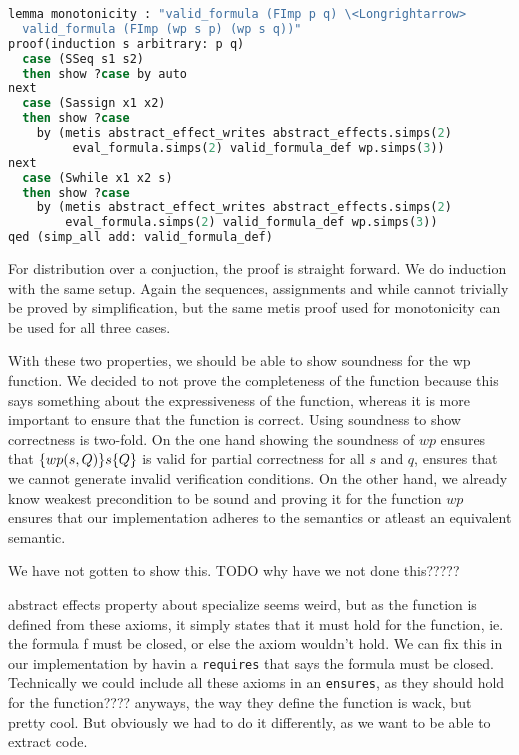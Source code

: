 \begin{lstlisting}[caption={Proof of monotonicity in Isabelle},label={lst:isamono},language=sml]
lemma monotonicity : "valid_formula (FImp p q) \<Longrightarrow>
  valid_formula (FImp (wp s p) (wp s q))"
proof(induction s arbitrary: p q)
  case (SSeq s1 s2)
  then show ?case by auto
next
  case (Sassign x1 x2)
  then show ?case
    by (metis abstract_effect_writes abstract_effects.simps(2)
         eval_formula.simps(2) valid_formula_def wp.simps(3))
next
  case (Swhile x1 x2 s)
  then show ?case
    by (metis abstract_effect_writes abstract_effects.simps(2)
        eval_formula.simps(2) valid_formula_def wp.simps(3))
qed (simp_all add: valid_formula_def)
\end{lstlisting}

For distribution over a conjuction, the proof is straight forward.
We do induction with the same setup.
Again the sequences, assignments and while cannot trivially be proved by simplification,
but the same metis proof used for monotonicity can be used for all three cases.

With these two properties, we should be able to show soundness for the wp function.
We decided to not prove the completeness of the function because this says something about the expressiveness of the function, whereas it is more important to ensure that
the function is correct.
Using soundness to show correctness is two-fold.
On the one hand showing the soundness of $wp$ ensures that $\{wp(s,Q)\}s\{Q\}$ is valid for partial correctness for all $s$ and $q$, ensures that we cannot generate invalid verification conditions.
On the other hand, we already know weakest precondition to be sound and proving it for the function $wp$ ensures that our implementation adheres to the semantics or atleast an equivalent semantic.

We have not gotten to show this.
TODO why have we not done this?????


abstract effects property about specialize seems weird, but as the function is defined
from these axioms, it simply states that it must hold for the function, ie. the formula f
must be closed, or else the axiom wouldn't hold.
We can fix this in our implementation by havin a \texttt{requires} that says the formula
must be closed.
Technically we could include all these axioms in an \texttt{ensures}, as they should hold
for the function???? anyways, the way they define the function is wack, but pretty cool.
But obviously we had to do it differently, as we want to be able to extract code.
